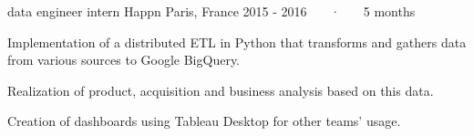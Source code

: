 \begin{cventries}
  \cventry
    {data engineer intern} %
    {Happn} %
    {Paris, France} %
    {2015 - 2016 ~~~·~~~ 5 months} %
    {
      \begin{cvitems} %
        \item {Implementation of a distributed ETL in Python that transforms and gathers data from various sources to Google BigQuery.}
        \item {Realization of product, acquisition and business analysis based on this data.}
        \item {Creation of dashboards using Tableau Desktop for other teams' usage.}
      \end{cvitems}
    }


\end{cventries}

